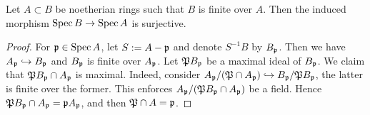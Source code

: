     \begin{lemma}\label{lem: finite inclusion induces surjective morphism}
        Let $A \subset B$ be noetherian rings such that $B$ is finite over $A$.
        Then the induced morphism $\operatorname{Spec} B \to \operatorname{Spec} A$ is surjective.
    \end{lemma}
    \begin{proof}
        For ${\mathfrak{p}} \in \operatorname{Spec} A$, let $S:= A-{\mathfrak{p}}$ and denote $S^{-1}B$ by $B_{\mathfrak{p}}$.
        Then we have $A_{\mathfrak{p}} \hookrightarrow B_{\mathfrak{p}}$ and $B_{\mathfrak{p}}$ is finite over $A_{\mathfrak{p}}$.
        Let ${\mathfrak{P}} B_{\mathfrak{p}}$ be a maximal ideal of $B_{\mathfrak{p}}$.
        We claim that ${\mathfrak{P}} B_{\mathfrak{p}} \cap A_{\mathfrak{p}}$ is maximal.
        Indeed, consider $A_{\mathfrak{p}}/({\mathfrak{P}} \cap A_{\mathfrak{p}}) \hookrightarrow B_{\mathfrak{p}}/{\mathfrak{P}} B_{\mathfrak{p}}$, the latter is finite over the former.
        This enforces $A_{\mathfrak{p}}/({\mathfrak{P}} B_{\mathfrak{p}} \cap A_{\mathfrak{p}})$ be a field.
        Hence ${\mathfrak{P}} B_{\mathfrak{p}} \cap A_{\mathfrak{p}} = {\mathfrak{p}} A_{\mathfrak{p}}$, and then ${\mathfrak{P}} \cap A = {\mathfrak{p}}$.
    \end{proof}




